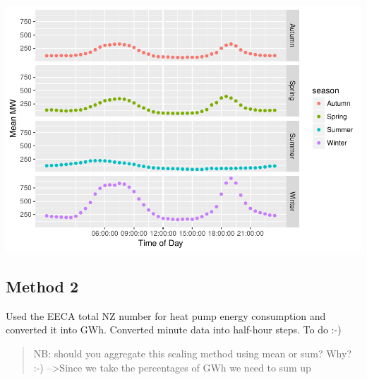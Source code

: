 \documentclass[]{article}
\theoremstyle{definition}
\theoremstyle{definition}
\theoremstyle{definition}
\theoremstyle{remark}
\begin{document}
\includegraphics{heatPumpProfileAnalysis_files/figure-latex/aggregateMethod1-1.pdf}

\subsection{Method 2}\label{method-2}

Used the EECA total NZ number for heat pump energy consumption and
converted it into GWh. Converted minute data into half-hour steps. To do
:-)

\begin{quote}
NB: should you aggregate this scaling method using mean or sum? Why? :-)
--\textgreater{}Since we take the percentages of GWh we need to sum up
\end{quote}
\end{document}
